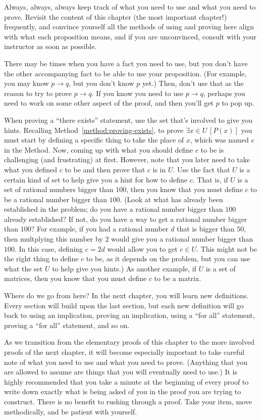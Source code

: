 \documentclass{book}
\theoremstyle{ekimcustom}
\begin{document}
Always, always, always keep track of what you need to use and what you need to prove. Revisit the content of this chapter (the most important chapter!) frequently, and convince yourself all the methods of using and proving here align with what each proposition means, and if you are unconvinced, consult with your instructor as soon as possible.

There may be times when you have a fact you need to use, but you don't have the other accompanying fact to be able to use your proposition. (For example, you may know $p \to q$, but you don't know $p$ yet.) Then, don't use that as the reason to try to prove $p \to q$. If you know you need to use $p \to q$, perhaps you need to work on some other aspect of the proof, and then you'll get $p$ to pop up.

When proving a ``there exists'' statement, use the set that's involved to give you hints. Recalling Method~\ref{method:proving-exists}, to prove $\exists x \in U\,[P(x)]$ you must start by defining a specific thing to take the place of $x$, which was named $c$ in the Method. Now, coming up with what you should define $c$ to be is challenging (and frustrating) at first. However, note that you later need to take what you defined $c$ to be and then prove that $c$ is in $U$. Use the fact that $U$ is a certain kind of set to help give you a hint for how to define $c$. That is, if $U$ is a set of rational numbers bigger than $100$, then you know that you must define $c$ to be a rational number bigger than $100$. (Look at what has already been established in the problem; do you have a rational number bigger than $100$ already established? If not, do you have a way to get a rational number bigger than $100$? For example, if you had a rational number $d$ that is bigger than $50$, then multplying this number by $2$ would give you a rational number bigger than $100$. In this case, defining $c=2d$ would allow you to get $c \in U$. This might not be the right thing to define $c$ to be, as it depends on the problem, but you can use what the set $U$ to help give you hints.) As another example, if $U$ is a set of matrices, then you know that you must define $c$ to be a matrix. 

Where do we go from here? In the next chapter, you will learn new definitions. Every section will build upon the last section, but each new definition will go back to using an implication, proving an implication, using a ``for all'' statement, proving a ``for all'' statement, and so on.

As we transition from the elementary proofs of this chapter to the more involved proofs of the next chapter, it will become especially important to take careful note of what you need to use and what you need to prove. (Anything that you are allowed to assume are things that you will eventually need to use.) It is highly recommended that you take a minute at the beginning of every proof to write down exactly what is being asked of you in the proof you are trying to construct. There is no benefit to rushing through a proof. Take your item, move methodically, and be patient with yourself.
\end{document}
